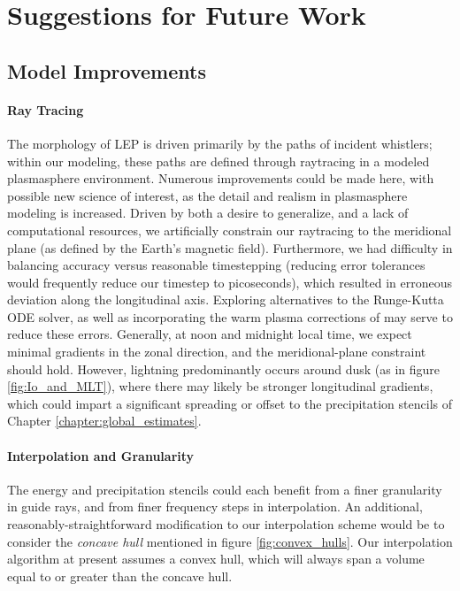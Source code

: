 \section{Suggestions for Future Work}

\subsection{Model Improvements}
\paragraph{Ray Tracing}
The morphology of LEP is driven primarily by the paths of incident whistlers; within our modeling, these paths are defined through raytracing in a modeled plasmasphere environment. Numerous improvements could be made here, with possible new science of interest, as the detail and realism in plasmasphere modeling is increased. Driven by both a desire to generalize, and a lack of computational resources, we artificially constrain our raytracing to the meridional plane (as defined by the Earth's magnetic field). Furthermore, we had difficulty in balancing accuracy versus reasonable timestepping (reducing error tolerances would frequently reduce our timestep to picoseconds), which resulted in erroneous deviation along the longitudinal axis. Exploring alternatives to the Runge-Kutta ODE solver, as well as incorporating the warm plasma corrections of 
\cite{Maxworth2017} may serve to reduce these errors.
Generally, at noon and midnight local time, we expect minimal gradients in the zonal direction, and the meridional-plane constraint should hold. However, lightning predominantly occurs around dusk (as in figure \ref{fig:Io_and_MLT}), where there may likely be stronger longitudinal gradients, which could impart a significant spreading or offset to the precipitation stencils of Chapter \ref{chapter:global_estimates}. %

\paragraph{Interpolation and Granularity}
The energy and precipitation stencils could each benefit from a finer granularity in guide rays, and from finer frequency steps in interpolation. An additional, reasonably-straightforward modification to our interpolation scheme would be to consider the \emph{concave hull} mentioned in figure \ref{fig:convex_hulls}. Our interpolation algorithm at present assumes a convex hull, which will always span a volume equal to or greater than the concave hull.

